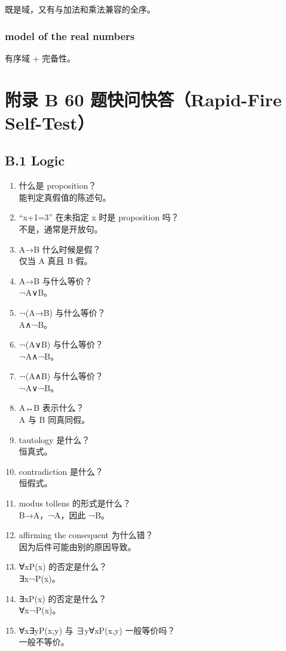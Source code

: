 \documentclass[
  11pt,
]{article}
\begin{document}
既是域，又有与加法和乘法兼容的全序。

\subsubsection{model of the real
numbers}\label{model-of-the-real-numbers}

有序域 + 完备性。

\section{附录 B 60 题快问快答（Rapid-Fire
Self-Test）}\label{ux9644ux5f55-b-60-ux9898ux5febux95eeux5febux7b54rapid-fire-self-test}

\subsection{B.1 Logic}\label{b.1-logic}

\begin{enumerate}
\def\labelenumi{\arabic{enumi}.}
\item
  什么是 proposition？\\
  能判定真假值的陈述句。
\item
  ``x+1=3'' 在未指定 x 时是 proposition 吗？\\
  不是，通常是开放句。
\item
  A→B 什么时候是假？\\
  仅当 A 真且 B 假。
\item
  A→B 与什么等价？\\
  ¬A∨B。
\item
  ¬(A→B) 与什么等价？\\
  A∧¬B。
\item
  ¬(A∨B) 与什么等价？\\
  ¬A∧¬B。
\item
  ¬(A∧B) 与什么等价？\\
  ¬A∨¬B。
\item
  A↔B 表示什么？\\
  A 与 B 同真同假。
\item
  tautology 是什么？\\
  恒真式。
\item
  contradiction 是什么？\\
  恒假式。
\item
  modus tollens 的形式是什么？\\
  B→A，¬A，因此 ¬B。
\item
  affirming the consequent 为什么错？\\
  因为后件可能由别的原因导致。
\item
  ∀xP(x) 的否定是什么？\\
  ∃x¬P(x)。
\item
  ∃xP(x) 的否定是什么？\\
  ∀x¬P(x)。
\item
  ∀x∃yP(x,y) 与 ∃y∀xP(x,y) 一般等价吗？\\
  一般不等价。
\end{enumerate}
\end{document}
